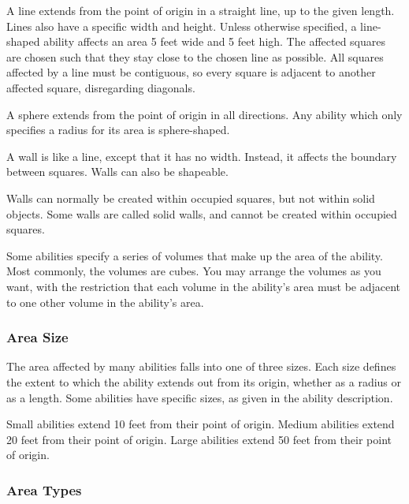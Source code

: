              A line extends from the point of origin in a straight line, up to the given length.
            Lines also have a specific width and height.
            Unless otherwise specified, a line-shaped ability affects an area 5 feet wide and 5 feet high.
            The affected squares are chosen such that they stay close to the chosen line as possible.
            All squares affected by a line must be contiguous, so every square is adjacent to another affected square, disregarding diagonals.

             A sphere extends from the point of origin in all directions.
            Any ability which only specifies a radius for its area is sphere-shaped.

             A wall is like a line, except that it has no width.
            Instead, it affects the boundary between squares.
            Walls can also be shapeable.

            Walls can normally be created within occupied squares, but not within solid objects.
            Some walls are called solid walls, and cannot be created within occupied squares.

             Some abilities specify a series of volumes that make up the area of the ability.
            Most commonly, the volumes are cubes.
            You may arrange the volumes as you want, with the restriction that each volume in the ability's area must be adjacent to one other volume in the ability's area.

        \subsubsection{Area Size}

            The area affected by many abilities falls into one of three sizes.
            Each size defines the extent to which the ability extends out from its origin, whether as a radius or as a length.
            Some abilities have specific sizes, as given in the ability description.

             Small abilities extend 10 feet from their point of origin.
             Medium abilities extend 20 feet from their point of origin.
             Large abilities extend 50 feet from their point of origin.

        \subsubsection{Area Types}\label{Area Types}

